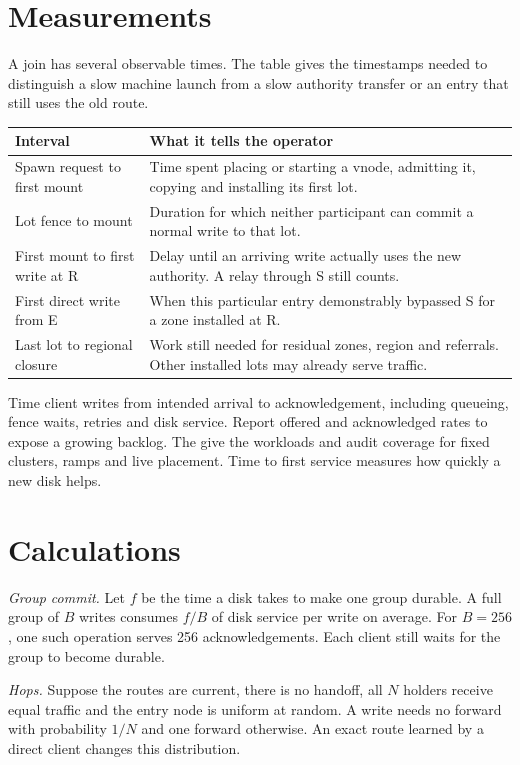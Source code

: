 \documentclass[11pt]{article}
\begin{document}
\section{Measurements}\hypertarget{ix:measurements}{}\label{sec:measurements}
A join has several observable times. The table gives the timestamps needed to distinguish a slow machine launch from a slow authority transfer or an entry that still uses the old route.
\begin{center}
\small
\begin{tabularx}{\linewidth}{@{}p{.32\linewidth}L@{}}
\toprule
Interval & What it tells the operator \\
\midrule
Spawn request to first mount & Time spent placing or starting a vnode, admitting it, copying and installing its first lot. \\
Lot fence to mount & Duration for which neither participant can commit a normal write to that lot. \\
First mount to first write at R & Delay until an arriving write actually uses the new authority. A relay through S still counts. \\
First direct write from E & When this particular entry demonstrably bypassed S for a zone installed at R. \\
Last lot to regional closure & Work still needed for residual zones, region and referrals. Other installed lots may already serve traffic. \\
\bottomrule
\end{tabularx}
\end{center}

Time client writes from intended arrival to acknowledgement, including queueing, fence waits, retries and disk service. Report offered and acknowledged rates to expose a growing backlog. The  give the workloads and audit coverage for fixed clusters, ramps and live placement. Time to first service measures how quickly a new disk helps.

\section{Calculations}
\textit{Group commit.} Let $f$ be the time a disk takes to make one group durable. A full group of $B$ writes consumes $f/B$ of disk service per write on average. For $B=256$, one such operation serves 256 acknowledgements. Each client still waits for the group to become durable.

\textit{Hops.} Suppose the routes are current, there is no handoff, all $N$ holders receive equal traffic and the entry node is uniform at random. A write needs no forward with probability $1/N$ and one forward otherwise. An exact route learned by a direct client changes this distribution.
\end{document}
